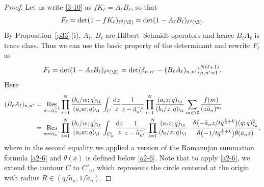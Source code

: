  \begin{proof}
 Let us write \eqref{3-10} as $f K_{\ell} = A_{\ell} B_{\ell}$, so that
 \[
 F_{\ell}=\det(1-fK_{\ell})_{\ell^2(\Z)}=\det(1-A_{\ell}B_{\ell})_{\ell^2(\Z)}.
 \]
 By Proposition~\ref{p33}\,(i), $A_{\ell}$, $B_{\ell}$ are
 Hilbert--Schmidt operators and hence $B_{\ell}A_{\ell}$ is trace class.
 Thus we can use the basic property of the determinant 
 and rewrite $F_{\ell}$ as
 \begin{align}
 \label{3-17d}
 F_{\ell}=\det(1-A_{\ell}B_{\ell})_{\ell^2(\Z)}
 =\det(\delta_{n,n'}-(B_{\ell}A_{\ell})_{n,n'})_{n,n'=1}^{N(\ell+1)}.
 \end{align}
Here
\begin{align*}%
 (B_{\ell}A_{\ell})_{n,n'}
 &=
 \underset{w=\tilde{a}_n^{-1}}{\text{Res}}
 \prod_{i=1}^N\frac{(b_i/w;q)_{\i}}{(a_i w;q)_{\i}}
 \int_C\frac{{\rm d}z}{z}
 \frac{1}{z-\tilde{a}_{n'}^{-1}}
 \prod_{i=1}^N\frac{(a_i z;q)_{\i}}{(b_i/z;q)_{\i}}
 \sum_{m\in\Z}\frac{f(m)}{(z\tilde{a}_{n})^m}
 \\
 &=
 \underset{w=\tilde{a}_{n}^{-1}}{\text{Res}}
 \prod_{i=1}^N\frac{(b_i/w;q)_{\i}}{(a_i w;q)_{\i}}
 \int_{C_{n}'}\frac{{\rm d}z}{z}
 \frac{1}{z-\tilde{a}_{n'}^{-1}}
 \prod_{i=1}^N\frac{(a_i z;q)_{\i}}{(b_i/z;q)_{\i}}
 \cdot
 \frac{\theta\bigl(-\tilde{a}_{n}z/tq^{\frac12+k}\bigr)(q;q)_{\i}^2}{\theta\bigl(-1/tq^{\frac12+k}\bigr)\theta(\tilde{a}_n z)},
\end{align*}
 where in the second equality we applied a version of the Ramanujan summation formula \eqref{a2-6} and $\theta(x)$ is defined below \eqref{a2-6}. Note that to apply
 \eqref{a2-6}, we extend the contour $C$ to $C'_n$,
 which represents the circle centered at the origin with radius $R\in(q/\tilde{a}_n,1/\tilde{a}_n)$.


\end{proof}
